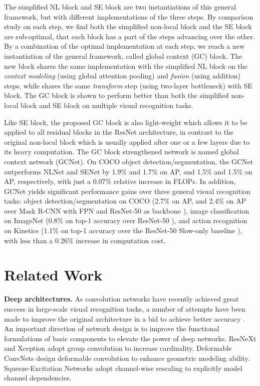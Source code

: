 \documentclass[10pt,twocolumn,letterpaper]{article}
\begin{document}
The simplified NL block and SE block are two instantiations of this general framework, but with different implementations of the three steps. By comparison study on each step, we find both the simplified non-local block and the SE block are sub-optimal, that each block has a part of the steps advancing over the other. By a combination of the optimal implementation at each step, we reach a new instantiation of the general framework, called global context (GC) block. The new block shares the same implementation with the simplified NL block on the \emph{context modeling} (using global attention pooling) and \emph{fusion} (using addition) steps, while shares the same \emph{transform} step (using two-layer bottleneck) with SE block. The GC block is shown to perform better than both the simplified non-local block and SE block on multiple visual recognition tasks. 

Like SE block, the proposed GC block is also light-weight which allows it to be applied to all residual blocks in the ResNet architecture, in contrast to the original non-local block which is usually applied after one or a few layers due to  its heavy computation. The GC block strengthened network is named global context network (GCNet). On COCO object detection/segmentation, the GCNet outperforms NLNet and SENet by 1.9\% and 1.7\% on AP, and 1.5\% and 1.5\% on AP, respectively, with just a 0.07\% relative increase in FLOPs.
In addition, GCNet yields significant performance gains over three general visual recognition tasks: {object detection/segmentation on COCO} (2.7\% on AP, and 2.4\% on AP over Mask R-CNN with FPN and ResNet-50 as backbone \cite{he2017mask}), {image classification on ImageNet} (0.8\% on top-1 accuracy over ResNet-50 \cite{he2015resnet}), and {action recognition on Kinetics} (1.1\% on top-1 accuracy over the ResNet-50 Slow-only baseline \cite{feichtenhofer2018slowfast}), with less than a 0.26\% increase in computation cost. 

\section{Related Work}
\textbf{Deep architectures.} 
As convolution networks have recently achieved great success in large-scale visual recognition tasks, a number of attempts have been made to improve the original architecture in a bid to achieve better accuracy \cite{krizhevsky2012imagenet,simonyan2014vgg,szegedy2015googlenet,he2015resnet,zagoruyko2016wide,huang2017densely,xie2017resnext,hu2018senet,zoph2018nasnet,hu2018gather,zhang2018shufflenet,howard2017mobilenets,dai2017dcnv1,zhu2018dcnv2,li2018detnet,carreira2017i3d,qiu2017P3D,wang2017non,xie2018rethinking,feichtenhofer2018slowfast}.
An important direction of network design is to improve the functional formulations of basic components to elevate the power of deep networks. 
ResNeXt \cite{xie2017resnext} and Xception \cite{chollet2017xception} adopt group convolution to increase cardinality.
Deformable ConvNets \cite{dai2017dcnv1,zhu2018dcnv2} design deformable convolution to enhance geometric modeling ability.
Squeeze-Excitation Networks \cite{hu2018senet} adopt channel-wise rescaling to explicitly model channel dependencies.
\end{document}
